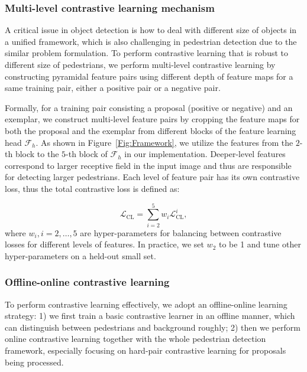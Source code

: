 \documentclass[journal]{IEEEtran}
\begin{document}
\subsubsection{Multi-level contrastive learning mechanism}
A critical issue in object detection is how to deal with different size of objects in a unified framework, which is also challenging in pedestrian detection due to the similar problem formulation.  
To perform contrastive learning that is robust to different size of pedestrians, we perform multi-level contrastive learning by constructing pyramidal feature pairs using different depth of feature maps for a same training pair, either a positive pair or a negative pair. 

Formally, for a training pair consisting a proposal (positive or negative) and an exemplar, we construct multi-level feature pairs by cropping the feature maps for both the proposal and the exemplar from different blocks of the feature learning head $\mathcal{F}_h$. As shown in Figure~\ref{Fig:Framework}, we utilize the features from the $2$-th block to the $5$-th block of $\mathcal{F}_h$ in our implementation. Deeper-level features correspond to larger receptive field in the input image and thus are responsible for detecting larger pedestrians. 
Each level of feature pair has its own contrastive loss, thus the total contrastive loss is defined as:
\begin{comment}




\end{comment}
\begin{equation}
\mathcal{L}_{\text{CL}} = \sum_{i=2}^5 w_i \mathcal{L}^i_{\text{CL}},
    \label{eqn:total_cl_loss}
\end{equation}
where $w_i, i=2, \dots, 5$ are hyper-parameters for balancing between contrastive losses for different levels of features. In practice, we set $w_2$ to be 1 and tune other hyper-parameters on a held-out small set.



\subsubsection{Offline-online contrastive learning}
To perform contrastive learning effectively, we adopt an offline-online learning strategy: 1) we first train a basic contrastive learner in an offline manner, which can distinguish between pedestrians and background roughly; 2) then we perform online contrastive learning together with the whole pedestrian detection framework, especially focusing on hard-pair contrastive learning for proposals being processed. 
\end{document}
